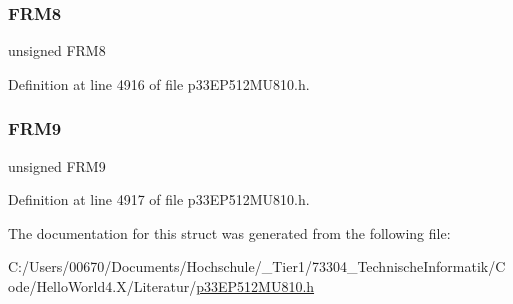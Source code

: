 \mbox{\label{structtag_u1_f_r_m_h_b_i_t_s_abcba4019e244c770bcf9d4f1005d6af3}} 
\subsubsection{\texorpdfstring{F\+R\+M8}{FRM8}}
{\footnotesize\ttfamily unsigned F\+R\+M8}



Definition at line 4916 of file p33\+E\+P512\+M\+U810.\+h.

\mbox{\label{structtag_u1_f_r_m_h_b_i_t_s_adc22dcac5b6f99eedca6d66d1b848343}} 
\subsubsection{\texorpdfstring{F\+R\+M9}{FRM9}}
{\footnotesize\ttfamily unsigned F\+R\+M9}



Definition at line 4917 of file p33\+E\+P512\+M\+U810.\+h.



The documentation for this struct was generated from the following file\+:\begin{DoxyCompactItemize}
\item 
C\+:/\+Users/00670/\+Documents/\+Hochschule/\+\_\+\+Tier1/73304\+\_\+\+Technische\+Informatik/\+Code/\+Hello\+World4.\+X/\+Literatur/\hyperlink{p33_e_p512_m_u810_8h}{p33\+E\+P512\+M\+U810.\+h}\end{DoxyCompactItemize}

